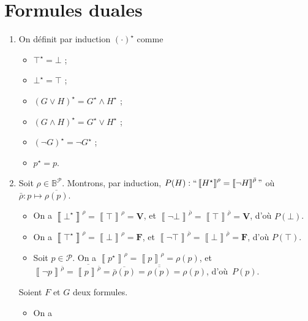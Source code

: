 \section{Formules duales}

\begin{enumerate}
	\item On définit par induction $(\cdot)^\star$\/ comme
		\begin{multicols}{3}
			\begin{itemize}
				\item $\top^\star = \bot$\/ ;
				\item $\bot^\star = \top$\/ ;
				\item $(G \lor H)^\star = G^\star \land H^\star$\/ ;
				\item $(G \land H)^\star = G^\star \lor H^\star$\/ ;
				\item $(\lnot G)^\star = \lnot G^\star$\/ ;
				\item $p^\star = p$.
			\end{itemize}
		\end{multicols}
	\item Soit $\rho \in \mathds{B}^{\mathcal{P}}$. Montrons, par induction, $P(H) : ``\left\llbracket H^\star \right\rrbracket^\rho = \left\llbracket \lnot H \right\rrbracket^{\bar \rho}"$\/ où $\bar{\rho} : p \mapsto \overline{\rho(p)}$.
		\begin{itemize}
			\item On a $\left\llbracket \bot^\star \right\rrbracket^\rho = \left\llbracket \top \right\rrbracket^\rho = \mathbf{V}$, et $\left\llbracket \lnot \bot \right\rrbracket^{\bar\rho} = \left\llbracket \top \right\rrbracket^{\bar\rho} = \mathbf{V}$, d'où $P(\bot)$.
			\item On a $\left\llbracket \top^\star \right\rrbracket^\rho = \left\llbracket \bot \right\rrbracket^\rho = \mathbf{F}$, et $\left\llbracket \lnot \top \right\rrbracket^{\bar\rho} = \left\llbracket \bot \right\rrbracket^{\bar\rho} = \mathbf{F}$, d'où $P(\top)$.
			\item Soit $p \in \mathcal{P}$. On a $\left\llbracket p^\star  \right\rrbracket^\rho = \left\llbracket p \right\rrbracket^\rho = \rho(p)$, et $\left\llbracket \lnot p \right\rrbracket^{\bar\rho} = \overline{\left\llbracket p \right\rrbracket^{\bar\rho}} = \overline{\bar\rho(p)} = \overline{\overline{\rho(p)}} = \rho(p)$, d'où~$P(p)$.
		\end{itemize}
		Soient $F$\/ et $G$\/ deux formules.
		\begin{itemize}
			\item On a

\end{itemize}
\end{enumerate}
